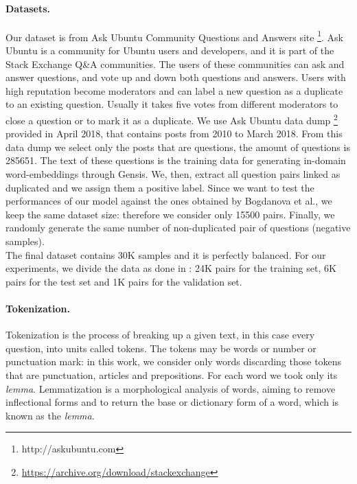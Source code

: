 \documentclass[10pt,twocolumn,letterpaper]{article}
\begin{document}
\paragraph{Datasets.}
Our dataset is from Ask Ubuntu Community Questions and Answers site \footnote{http://askubuntu.com}. Ask Ubuntu is a community for Ubuntu users and developers, and it is part of the Stack Exchange Q\&A communities. The users of these communities can ask and answer questions, and vote up and down both questions and answers. Users with high reputation become moderators and can label a new question as a duplicate to an existing question. Usually it takes five votes from different moderators to close a question or to mark it as a duplicate. 
We use Ask Ubuntu data dump \footnote{ \url{https://archive.org/download/stackexchange}} provided in April 2018, that contains posts from 2010 to March 2018. From this data dump we select only the posts that are questions, the amount of questions is 285651. The text of these questions is the training data for generating in-domain word-embeddings through Gensis. We, then, extract all question pairs linked as duplicated and we assign them a positive label. Since we want to test the performances of our model against the ones obtained by Bogdanova et al., we keep the same dataset size: therefore we consider only 15500 pairs. Finally, we randomly generate the same number of non-duplicated pair of questions (negative samples). \\
The final dataset contains 30K samples and it is perfectly balanced. For our experiments, we divide the data as done in \cite{bogdanova2015detecting}: 24K pairs for the training set, 6K pairs for the test set and 1K pairs for the validation set.

\paragraph{Tokenization.}
Tokenization is the process of breaking up a given text, in this case every question, into units called tokens. The tokens may be words or number or punctuation mark: in this work, we consider only words discarding those tokens that are punctuation, articles and prepositions.
For each word we took only its \emph{lemma}. Lemmatization is a morphological analysis of words, aiming to remove inflectional forms and to return the base or dictionary form of a word, which is known as the \emph{lemma}.
\end{document}
